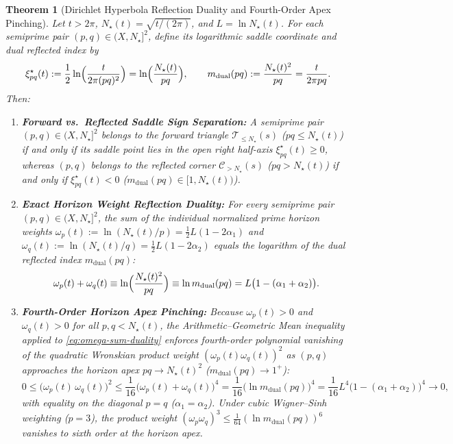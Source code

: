 \documentclass[11pt,reqno]{amsart}
\newtheorem{theorem}{Theorem}[section]
\theoremstyle{definition}
\theoremstyle{remark}
\numberwithin{equation}{section}
\newcommand{\dual}{\mathrm{dual}}
\begin{document}
\begin{theorem}[Dirichlet Hyperbola Reflection Duality and Fourth-Order Apex Pinching]\label{thm:hyperbola-duality}
Let $t > 2\pi$, $N_\star(t) = \sqrt{t/(2\pi)}$, and $L = \ln N_\star(t)$. For each semiprime pair $(p,q) \in (X,N_\star]^2$, define its logarithmic saddle coordinate and dual reflected index by
\begin{equation}\label{eq:xi-mdual-defs}
\xi_{pq}^\star(t) := \frac{1}{2}\ln\Bigl(\frac{t}{2\pi(pq)^2}\Bigr) = \ln\Bigl(\frac{N_\star(t)}{pq}\Bigr), \qquad m_{\dual}(pq) := \frac{N_\star(t)^2}{pq} = \frac{t}{2\pi pq}.
\end{equation}
Then:
\begin{enumerate}[label=\upshape(\alph*),leftmargin=2.2em]
\item \textbf{Forward vs.\ Reflected Saddle Sign Separation:} A semiprime pair $(p,q) \in (X,N_\star]^2$ belongs to the forward triangle $\mathcal{T}_{\le N_\star}(s)$ ($pq \le N_\star(t)$) if and only if its saddle point lies in the open right half-axis $\xi_{pq}^\star(t) \ge 0$, whereas $(p,q)$ belongs to the reflected corner $\mathcal{C}_{>N_\star}(s)$ ($pq > N_\star(t)$) if and only if $\xi_{pq}^\star(t) < 0$ ($m_{\dual}(pq) \in [1, N_\star(t))$).
\item \textbf{Exact Horizon Weight Reflection Duality:} For every semiprime pair $(p,q) \in (X,N_\star]^2$, the sum of the individual normalized prime horizon weights $\omega_p(t) := \ln(N_\star(t)/p) = \frac{1}{2}L(1-2\alpha_1)$ and $\omega_q(t) := \ln(N_\star(t)/q) = \frac{1}{2}L(1-2\alpha_2)$ equals the logarithm of the dual reflected index $m_{\dual}(pq)$:
\begin{equation}\label{eq:omega-sum-duality}
\omega_p(t) + \omega_q(t) \equiv \ln\Bigl(\frac{N_\star(t)^2}{pq}\Bigr) \equiv \ln m_{\dual}(pq) = L\bigl(1 - (\alpha_1 + \alpha_2)\bigr).
\end{equation}
\item \textbf{Fourth-Order Horizon Apex Pinching:} Because $\omega_p(t) > 0$ and $\omega_q(t) > 0$ for all $p,q < N_\star(t)$, the Arithmetic--Geometric Mean inequality applied to \eqref{eq:omega-sum-duality} enforces fourth-order polynomial vanishing of the quadratic Wronskian product weight $(\omega_p(t)\omega_q(t))^2$ as $(p,q)$ approaches the horizon apex $pq \to N_\star(t)^2$ ($m_{\dual}(pq) \to 1^+$):
\begin{equation}\label{eq:apex-pinching}
0 \le \bigl(\omega_p(t)\,\omega_q(t)\bigr)^2 \le \frac{1}{16}\bigl(\omega_p(t) + \omega_q(t)\bigr)^4 = \frac{1}{16}\bigl(\ln m_{\dual}(pq)\bigr)^4 = \frac{1}{16}L^4\bigl(1 - (\alpha_1+\alpha_2)\bigr)^4 \longrightarrow 0,
\end{equation}
with equality on the diagonal $p=q$ ($\alpha_1=\alpha_2$). Under cubic Wigner--Sinh weighting ($p=3$), the product weight $(\omega_p\omega_q)^3 \le \frac{1}{64}(\ln m_{\dual}(pq))^6$ vanishes to sixth order at the horizon apex.
\end{enumerate}
\end{theorem}
\end{document}
